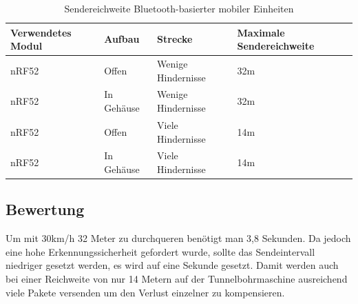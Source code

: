 \begin{table}[h]
	\centering
	\caption{Sendereichweite Bluetooth-basierter mobiler Einheiten}
	\label{table:rangeblue}
	\begin{tabular}{p{3.5cm}|p{3cm}|p{3.5cm}|p{3cm}}
		Verwendetes Modul & Aufbau & Strecke & Maximale Sendereichweite \\
		\hline
		nRF52 & Offen & Wenige Hindernisse & 32m \\
		nRF52 & In Gehäuse & Wenige Hindernisse & 32m \\
		nRF52 & Offen & Viele Hindernisse & 14m \\
		nRF52 & In Gehäuse & Viele Hindernisse & 14m \\
	\end{tabular}
\end{table}

\subsection{Bewertung}
Um mit 30km/h 32 Meter zu durchqueren benötigt man 3,8 Sekunden.
Da jedoch eine hohe Erkennungssicherheit gefordert wurde, sollte das Sendeintervall niedriger gesetzt werden, es wird auf eine Sekunde gesetzt.
Damit werden auch bei einer Reichweite von nur 14 Metern auf der Tunnelbohrmaschine ausreichend viele Pakete versenden um den Verlust einzelner zu kompensieren.

